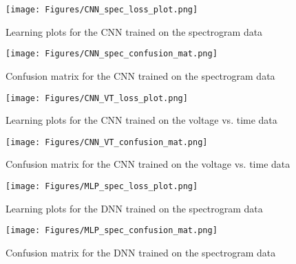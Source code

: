 \documentclass[fleqn,10pt]{SelfArx} %
\begin{document}
\begin{figure*}
    \centering
    \begin{subfigure}[b]{0.35\linewidth} %
        \centering
        \texttt{[image: Figures/CNN\_spec\_loss\_plot.png]}
        \caption{Learning plots for the CNN trained on the spectrogram data}
        \label{fig:CNN_spec_loss_plot}
    \end{subfigure}%
    \begin{subfigure}[b]{0.35\linewidth} %
        \centering
        \texttt{[image: Figures/CNN\_spec\_confusion\_mat.png]} %
        \caption{Confusion matrix for the CNN trained on the spectrogram data}
        \label{fig:CNN_spec_confusion_mat}
    \end{subfigure}
    \begin{subfigure}[b]{0.33\linewidth} %
        \centering
        \texttt{[image: Figures/CNN\_VT\_loss\_plot.png]} %
        \caption{Learning plots for the CNN trained on the voltage vs. time data}
        \label{fig:CNN_VT_loss_plot.png}
    \end{subfigure}
    \begin{subfigure}[b]{0.33\linewidth} %
        \centering
        \texttt{[image: Figures/CNN\_VT\_confusion\_mat.png]} %
        \caption{Confusion matrix for the CNN trained on the voltage vs. time data}
        \label{fig:CNN_VT_confusion_mat.png}
    \end{subfigure}
    \begin{subfigure}[b]{0.35\linewidth} %
        \centering
        \texttt{[image: Figures/MLP\_spec\_loss\_plot.png]} %
        \caption{Learning plots for the DNN trained on the spectrogram data}
        \label{fig:MLP_spec_loss_plot.png}
    \end{subfigure}
    \begin{subfigure}[b]{0.35\linewidth} %
        \centering
        \texttt{[image: Figures/MLP\_spec\_confusion\_mat.png]} %
        \caption{Confusion matrix for the DNN trained on the spectrogram data}
        \label{fig:MLP_spec_confusion_mat.png}
    \end{subfigure}
    \begin{subfigure}[b]{0.35\linewidth} %

\end{subfigure}
\end{figure*}
\end{document}

